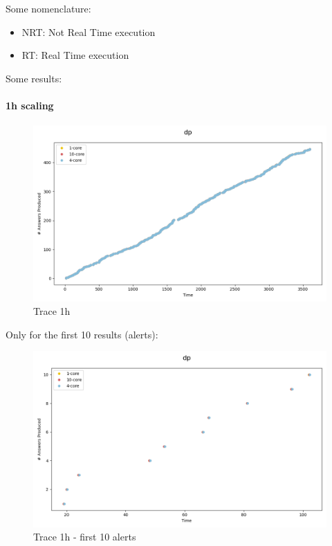 Some nomenclature:
\begin{itemize}
  \item NRT: Not Real Time execution
  \item RT: Real Time execution
\end{itemize}

Some results:

\paragraph{1h scaling\\}


\begin{figure}[H]
  \centering
  \includegraphics[scale = 0.5]{images/4-Experiments/traces-1h.png}
  \caption{Trace 1h}
\end{figure}

Only for the first 10 results (alerts):
\begin{figure}[H]
  \centering
  \includegraphics[scale = 0.5]{images/4-Experiments/traces-1h-10.png}
  \caption{Trace 1h - first 10 alerts}
\end{figure}

